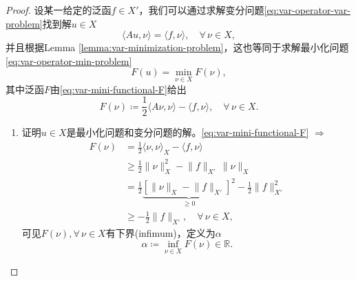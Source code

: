 \begin{proof}
  设某一给定的泛函$f \in X'$，我们可以通过求解变分问题\eqref{eq:var-operator-var-problem}找到解$u \in X$
  \begin{equation*}
    \langle Au,\nu \rangle = \langle f, \nu \rangle, \quad \forall \, \nu \in X,
  \end{equation*}
并且根据Lemma \ref{lemma:var-minimization-problem}，这也等同于求解最小化问题\eqref{eq:var-operator-min-problem}
\begin{equation*}
  F(u) = \min_{\nu \in X} F(\nu),
\end{equation*}
其中泛函$F$由\eqref{eq:var-mini-functional-F}给出
\begin{equation*}
  F(\nu) \coloneqq \frac{1}{2} \langle A\nu, \nu \rangle - \langle f, \nu \rangle, \quad \forall \, \nu \in X.
\end{equation*}

\begin{enumerate}

\item 证明$u \in X$是最小化问题和变分问题的解。\eqref{eq:var-mini-functional-F} $\Rightarrow$
\begin{equation*}
  \begin{split}
    F(\nu) &=  \frac{1}{2} \langle  \nu, \nu \rangle_{X} - \langle f,\nu\rangle\\
    &\ge \frac{1}{2} \big\| \nu \big\|_{X}^2 - \big\| f \big\|_{X'} \, \big\| \nu \big\|_{X} \\
    &= \frac{1}{2} \underbrace{
    \left[
    \big\| \nu \big\|_{X} - \big\| f \big\|_{X'}
    \right]^2}_{\ge 0} - \frac{1}{2} \big\| f \big\|_{X'}^2 \\
    & \ge - \frac{1}{2} \big\| f \big\|_{X'}, \quad \forall \, \nu \in X,
  \end{split}
\end{equation*}
可见$F(\nu), \forall \, \nu \in X$有下界(infimum)，定义为$\alpha$
\begin{equation*}
  \alpha \coloneqq \inf_{\nu \in X} F(\nu) \in \mathbb{R}.
\end{equation*}


\end{enumerate}
\end{proof}
